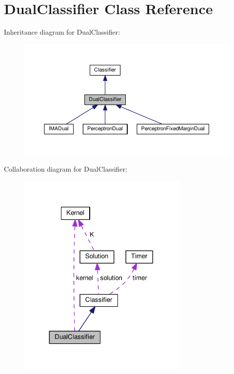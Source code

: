 \hypertarget{class_dual_classifier}{}\section{Dual\+Classifier Class Reference}
\label{class_dual_classifier}


Inheritance diagram for Dual\+Classifier\+:\nopagebreak
\begin{figure}[H]
\begin{center}
\leavevmode
\includegraphics[width=350pt]{class_dual_classifier__inherit__graph}
\end{center}
\end{figure}


Collaboration diagram for Dual\+Classifier\+:\nopagebreak
\begin{figure}[H]
\begin{center}
\leavevmode
\includegraphics[width=239pt]{class_dual_classifier__coll__graph}
\end{center}
\end{figure}
